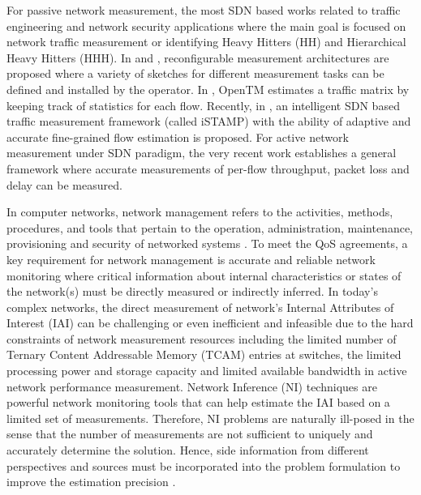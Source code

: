 For passive network measurement, the most SDN based works related to traffic engineering and network security applications where the main goal is focused on network traffic measurement or identifying Heavy Hitters (HH) and Hierarchical Heavy Hitters (HHH). In \cite{MYu:2011} and \cite{MYu:2013}, reconfigurable measurement architectures are proposed where a variety of sketches for different measurement tasks can be defined and installed by the operator. In \cite{Tootoonchian:2010}, OpenTM estimates a traffic matrix by keeping track of statistics for each flow. Recently, in \cite{IF14iSTAMP:2014}, an intelligent SDN based traffic measurement framework (called iSTAMP) with the ability of adaptive and accurate fine-grained flow estimation is proposed. For active network measurement under SDN paradigm, the very recent work \cite{Adrichen:2014} establishes a general framework where accurate measurements of per-flow throughput, packet loss and delay can be measured.






In computer networks, network management refers to the activities, methods, procedures, and tools that pertain to the operation, administration, maintenance, provisioning and security of networked systems \cite{Clemmi:2006}. To meet the QoS agreements, a key requirement for network management is accurate and reliable network monitoring where critical information about internal characteristics or states of the network(s) must be directly measured or indirectly inferred. In today's complex networks, the direct measurement of network's Internal Attributes of Interest (IAI) can be challenging or even inefficient and infeasible due to the hard constraints of network measurement resources including the limited number of Ternary Content Addressable Memory (TCAM) entries at switches, the limited processing power and storage capacity and limited available bandwidth in active network performance measurement. Network Inference (NI) techniques are powerful network monitoring tools that can help estimate the IAI based on a limited set of measurements. Therefore, NI problems are naturally ill-posed in the sense that the number of measurements are not sufficient to uniquely and accurately determine the solution. Hence, side information from different perspectives and sources must be incorporated into the problem formulation to improve the estimation precision \cite{QZhao:2006} \cite{MDFE:2013} \cite{HNguyen:2007}. %


